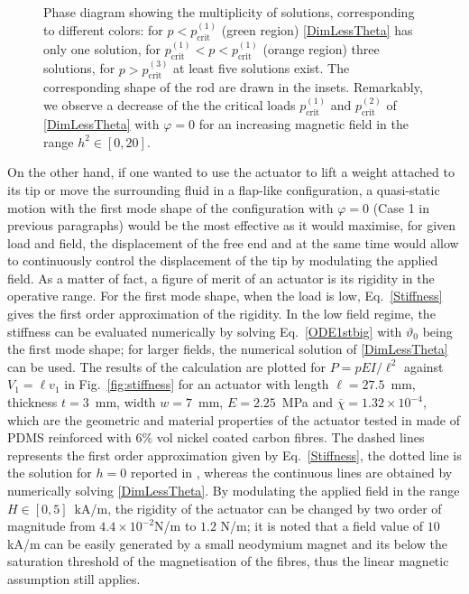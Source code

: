 \documentclass[oneside]{article}
\begin{document}
			\begin{figure}[h]
				\begin{center}
					\begin{tiny}
						\def\svgwidth{.7\textwidth}
						
					\end{tiny}
					\caption{Phase diagram showing the multiplicity of solutions, corresponding to different colors: for $p<p_\text{crit}^{(1)}$ (green region) \eqref{DimLessTheta} has only one solution, for $p_\text{crit}^{(1)}<p<p_\text{crit}^{(1)}$ (orange region) three solutions, for $p>p_\text{crit}^{(3)}$ at least five solutions exist. The corresponding shape of the rod are drawn in the insets. Remarkably, we observe a decrease of the the critical loads $p_\text{crit}^{(1)}$ and $p_\text{crit}^{(2)}$ of \eqref{DimLessTheta} with $\varphi=0$ for an increasing magnetic field in the range $h^2\in \left[ 0,20\right]$.\vspace{-0.9cm}}
					\label{fig:pmin_vs_chi}
				\end{center}
			\end{figure}
			
			On the other hand, if one wanted to use the actuator to lift a weight attached to its tip or move the surrounding fluid in a flap-like configuration, a quasi-static motion with the first mode shape of the configuration with $\varphi=0$ (Case 1 in previous paragraphs) would be the most effective as it would maximise, for given load and field, the displacement of the free end and at the same time would allow to continuously control the displacement of the tip by modulating the applied field. As a matter of fact, a figure of merit of an actuator is its rigidity in the operative range. For the first mode shape, when the load is low, Eq.~\eqref{Stiffness} gives the first order approximation of the rigidity. In the low field regime, the stiffness can be evaluated numerically by solving Eq.~\eqref{ODE1stbig} with $\vartheta_0$ being the first mode shape; for larger fields, the numerical solution of \eqref{DimLessTheta} can be used. The results of the calculation are plotted for $P=pEI/\ell^2$ against $V_1=\ell v_1$ in Fig.~\ref{fig:stiffness} for an actuator with length $\ell=27.5$~mm, thickness $t=3$~mm, width $w=7$~mm, $E=2.25$~MPa and $\overline{\chi}=1.32\times10^{-4}$, which are the geometric and material properties of the actuator tested in \cite{Stanier2016} made of PDMS reinforced with $6\%$ vol nickel coated carbon fibres. The dashed lines represents the first order approximation given by Eq.~\eqref{Stiffness}, the dotted line is the solution for $h=0$ reported in \cite{Levyakov2010}, whereas the continuous lines are obtained by numerically solving \eqref{DimLessTheta}. By modulating the applied field in the range $H\in\left[0, 5 \right]$~kA/m, the rigidity of the actuator can be changed by two order of magnitude from $4.4\times 10^{-2}$N/m to $1.2$ N/m; it is noted that a field value of $10~$kA/m can be easily generated by a small neodymium magnet and its below the saturation threshold of the magnetisation of the fibres\cite{Stanier2016}, thus the linear magnetic assumption  still applies.
			
\end{document}

